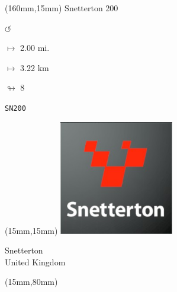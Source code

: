 \begin{textblock*}{40mm}(160mm,15mm)%
Snetterton 200
\par \Huge$\circlearrowleft$
\Large
\par$\mapsto$ 2.00 mi.
\par$\mapsto$ 3.22 km
\par$\looparrowright$ 8
\par\hfill\tiny\tt SN200\\
\end{textblock*}
\null\newpage

\begin{textblock*}{50mm}(15mm,15mm)%
\includegraphics[width=50mm]{LG/2015-05-20_00095.png}
\par Snetterton\\ United Kingdom
\end{textblock*}
\begin{textblock*}{185mm}(15mm,80mm)%
\end{textblock*}
